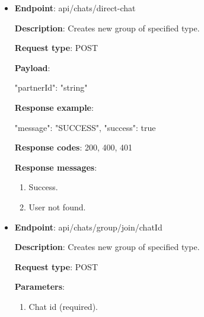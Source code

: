 \begin{itemize}
    \textbf{Response codes}: 200, 400, 401

    \textbf{Response messages}:
    \begin{enumerate}
        \item Success.
        \item User not found.
    \end{enumerate}

    \vspace{5mm}

    \item \textbf{Endpoint}: api/chats/direct-chat

    \textbf{Description}: Creates new group of specified type.

    \textbf{Request type}: POST

    \textbf{Payload}:

    \begin{spverbatim}
    {
        "partnerId": "string"
    }
    \end{spverbatim}

    \textbf{Response example}:

    \begin{spverbatim}
    {
        "message": "SUCCESS",
        "success": true
    }
    \end{spverbatim}

    \textbf{Response codes}: 200, 400, 401

    \textbf{Response messages}:
    \begin{enumerate}
        \item Success.
        \item User not found.
    \end{enumerate}

    \vspace{5mm}

    \item \textbf{Endpoint}: api/chats/group/join/{chatId}

    \textbf{Description}: Creates new group of specified type.

    \textbf{Request type}: POST

    \textbf{Parameters}:

    \begin{enumerate}
        \item Chat id (required).
    \end{enumerate}


\end{itemize}
